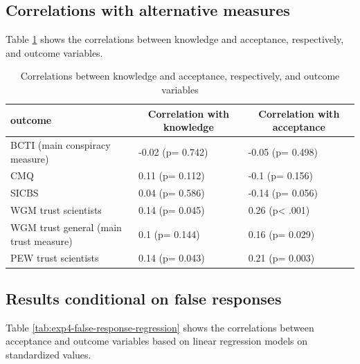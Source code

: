 \documentclass[
  doc,floatsintext]{apa6}
\begin{document}
\subsection{Correlations with alternative measures}\label{correlations-with-alternative-measures-3}

Table \ref{tab:exp4-correlations-outcomes} shows the correlations between knowledge and acceptance, respectively, and outcome variables.

\begin{table}[tbp]

\begin{center}
\begin{threeparttable}

\caption{\label{tab:exp4-correlations-outcomes}Correlations between knowledge and acceptance, respectively, and outcome variables}

\begin{tabular}{lll}
\toprule
outcome & \multicolumn{1}{c}{Correlation with knowledge} & \multicolumn{1}{c}{Correlation with acceptance}\\
\midrule
BCTI 
(main conspiracy measure) & -0.02 (p= 0.742) & -0.05 (p= 0.498)\\
CMQ & 0.11 (p= 0.112) & -0.1 (p= 0.156)\\
SICBS & 0.04 (p= 0.586) & -0.14 (p= 0.056)\\
WGM trust scientists & 0.14 (p= 0.045) & 0.26 (p< .001)\\
WGM trust general 
(main trust measure) & 0.1 (p= 0.144) & 0.16 (p= 0.029)\\
PEW trust scientists & 0.14 (p= 0.043) & 0.21 (p= 0.003)\\
\bottomrule
\end{tabular}

\end{threeparttable}
\end{center}

\end{table}

\subsection{Results conditional on false responses}\label{results-conditional-on-false-responses-3}

Table \ref{tab:exp4-false-response-regression} shows the correlations between acceptance and outcome variables based on linear regression models on standardized values.
\end{document}
